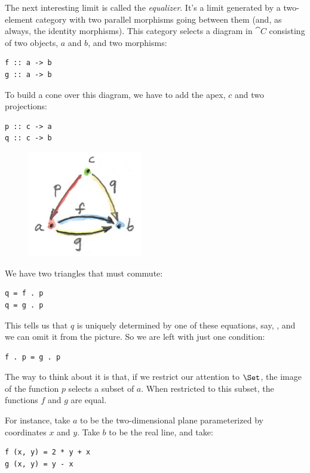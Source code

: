 The next interesting limit is called the \emph{equalizer}. It's a limit
generated by a two-element category with two parallel morphisms going
between them (and, as always, the identity morphisms). This category
selects a diagram in $\cat{C}$ consisting of two objects, $a$ and
$b$, and two morphisms:

\begin{Verbatim}
f :: a -> b 
g :: a -> b
\end{Verbatim}

To build a cone over this diagram, we have to add the apex, $c$
and two projections:

\begin{Verbatim}
p :: c -> a 
q :: c -> b
\end{Verbatim}

\begin{figure}[H]
\centering
\includegraphics[width=50mm]{images/equalizercone.jpg}
\end{figure}

\noindent
We have two triangles that must commute:

\begin{Verbatim}
q = f . p 
q = g . p
\end{Verbatim}

This tells us that $q$ is uniquely determined by one of these
equations, say, , and we can omit it from the
picture. So we are left with just one condition:

\begin{Verbatim}
f . p = g . p
\end{Verbatim}

The way to think about it is that, if we restrict our attention to
$\Set$, the image of the function $p$ selects a subset of
$a$. When restricted to this subset, the functions $f$ and
$g$ are equal.

For instance, take $a$ to be the two-dimensional plane
parameterized by coordinates $x$ and $y$. Take $b$
to be the real line, and take:

\begin{Verbatim}
f (x, y) = 2 * y + x 
g (x, y) = y - x
\end{Verbatim}

